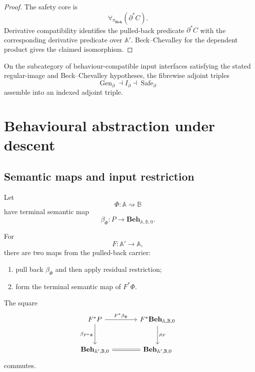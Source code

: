 \begin{proof}
The safety core is
\[
    \forall_{\pi_{\mathbf{Beh}}}
    \left(
    \partial^\ast C
    \right).
\]
Derivative compatibility identifies the pulled-back predicate
\(\partial^\ast C\) with the corresponding derivative predicate over
\(\mathbb A'\). Beck--Chevalley for the dependent product gives the claimed
isomorphism.
\end{proof}

\begin{corollary}
\label{cor:indexed-adjoint-triple}
On the subcategory of behaviour-compatible input interfaces satisfying the
stated regular-image and Beck--Chevalley hypotheses, the fibrewise adjoint
triples
\[
    \operatorname{Gen}_{\partial}
    \dashv
    I_{\partial}
    \dashv
    \operatorname{Safe}_{\partial}
\]
assemble into an indexed adjoint triple.
\end{corollary}

\section{Behavioural abstraction under descent}
\label{sec:behavioural-abstraction-descent}

\subsection{Semantic maps and input restriction}
\label{subsec:semantic-maps-input-restriction}

Let
\[
    \Phi:\mathbb A\rightsquigarrow\mathbb B
\]
have terminal semantic map
\[
    \beta_\Phi:
    P\to
    \mathbf{Beh}_{\mathbb A,\mathbb B,0}.
\]

For
\[
    F:\mathbb A'\to\mathbb A,
\]
there are two maps from the pulled-back carrier:
\begin{enumerate}
    \item pull back \(\beta_\Phi\) and then apply residual restriction;
    \item form the terminal semantic map of \(F^\ast\Phi\).
\end{enumerate}

\begin{proposition}
\label{prop:naturality-residual-semantics-input}
The square
\[
\begin{tikzcd}[column sep=large,row sep=large]
    F^\ast P
        \arrow[r, "F^\ast\beta_\Phi"]
        \arrow[d, "\beta_{F^\ast\Phi}"']
    &
    F^\ast
    \mathbf{Beh}_{\mathbb A,\mathbb B,0}
        \arrow[d, "\rho_F"]
    \\
    \mathbf{Beh}_{\mathbb A',\mathbb B,0}
        \arrow[r, equal]
    &
    \mathbf{Beh}_{\mathbb A',\mathbb B,0}
\end{tikzcd}
\]
commutes.
\end{proposition}


